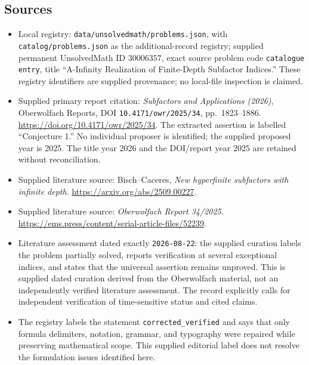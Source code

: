 \documentclass[11pt]{article}
\begin{document}
\subsection{Sources}
\begin{itemize}
\item Local registry: \texttt{data/unsolvedmath/problems.json}, with \texttt{catalog/problems.json} as the additional-record registry; supplied permanent UnsolvedMath ID \(30006357\), exact source problem code \texttt{catalogue entry}, title ``A-Infinity Realization of Finite-Depth Subfactor Indices.'' These registry identifiers are supplied provenance; no local-file inspection is claimed.
\item Supplied primary report citation: \emph{Subfactors and Applications (2026)}, Oberwolfach Reports, DOI \texttt{10.4171/owr/2025/34}, pp.\ 1823--1886. \url{https://doi.org/10.4171/owr/2025/34}. The extracted assertion is labelled ``Conjecture 1.'' No individual proposer is identified; the supplied proposed year is 2025. The title year 2026 and the DOI/report year 2025 are retained without reconciliation.
\item Supplied literature source: Bisch--Caceres, \emph{New hyperfinite subfactors with infinite depth}. \url{https://arxiv.org/abs/2509.00227}.
\item Supplied literature source: \emph{Oberwolfach Report 34/2025}. \url{https://ems.press/content/serial-article-files/52239}.
\item Literature assessment dated exactly \texttt{2026-08-22}: the supplied curation labels the problem partially solved, reports verification at several exceptional indices, and states that the universal assertion remains unproved. This is supplied dated curation derived from the Oberwolfach material, not an independently verified literature assessment. The record explicitly calls for independent verification of time-sensitive status and cited claims.
\item The registry labels the statement \texttt{corrected\_verified} and says that only formula delimiters, notation, grammar, and typography were repaired while preserving mathematical scope. This supplied editorial label does not resolve the formulation issues identified here.
\end{itemize}
\end{document}

